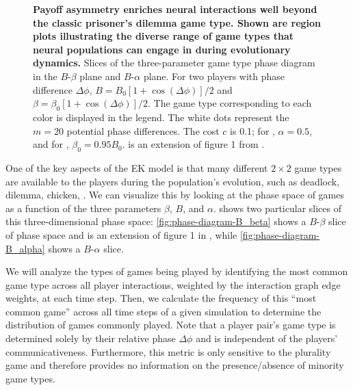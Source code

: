 \documentclass[pdflatex,lineno,referee,sn-nature]{sn-jnl}
\begin{document}
\begin{figure}
  \centering
  \begin{subcaptiongroup}
      {\label{fig:phase-diagram-B_alpha}\captiontext*{}}{%
      {\label{fig:phase-diagram-B_beta}\captiontext*{}}{%
    {}%
  }}
  \end{subcaptiongroup}
  \caption{
    \textbf{
      Payoff asymmetry enriches neural interactions
      well beyond the classic prisoner's dilemma game type.
      Shown are region plots illustrating the diverse range
      of game types that neural populations can engage in
      during evolutionary dynamics.
    }
    Slices of the three-parameter game type phase diagram
    in the
    $B$-$\beta$ plane
    and
    $B$-$\alpha$ plane.
    For two players with phase difference $\Delta \phi$,
    $B = B_0 [1 + \cos(\Delta \phi)]/2$
    and
    $\beta = \beta_0 [1 + \cos(\Delta \phi)]/2$.
    The game type corresponding to each color is displayed in the legend.
    The white dots represent the $m=20$ potential phase differences.
    The cost $c$ is \num{0.1};
    for
    ,
    $\alpha = 0.5$,
    and for
    ,
    $\beta_0 = \num{0.95} B_0$.
    is an extension of figure 1 from \tripp{}.
  }
  \label{fig:phase-diagram}
\end{figure}

One of the key aspects of the EK model
is that many different $2 \times 2$ game types
are available to the players during the population's evolution,
such as deadlock, dilemma, chicken, \etc{}
\citep[\cf{}][for definitions]{bruns2015names}.
We can visualize this by looking at the phase space of games
as a function of the three parameters $\beta$, $B$, and $\alpha$.
 shows two particular slices
of this three-dimensional phase space:
\cref{fig:phase-diagram-B_beta} shows a $B$-$\beta$ slice of phase space
and is an extension of figure 1 in \tripp{},
while \cref{fig:phase-diagram-B_alpha} shows a $B$-$\alpha$ slice.

We will analyze the types of games being played by
identifying the most common game type across all player interactions,
weighted by the interaction graph edge weights,
at each time step.
Then, we calculate the frequency of this ``most common game'' across
all time steps of a given simulation to determine the distribution
of games commonly played.
Note that a player pair's game type is determined solely
by their relative phase $\Delta \phi$ and is independent
of the players' communicativeness.
Furthermore, this metric is only sensitive to the
plurality game and therefore provides no information
on the presence/absence of minority game types.
\end{document}

